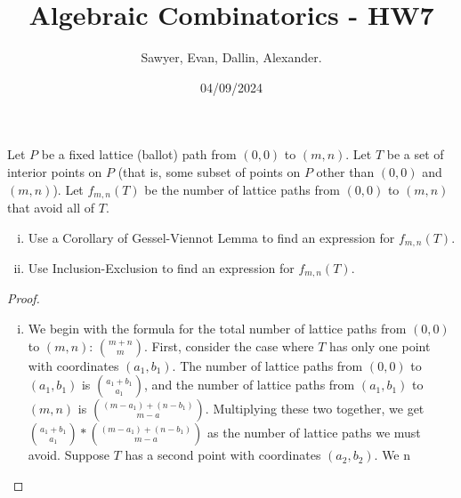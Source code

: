 \documentclass[letterpaper]{article}
\title{Algebraic Combinatorics - HW7}
\author{Sawyer, Evan, Dallin, Alexander.}
\date{04/09/2024}
\begin{document}
\maketitle
\begin{quest}[\textcolor{red}{Lattice Paths avoiding a certain set of points}]
Let $P$ be a fixed lattice (ballot) path from $(0,0)$ to $(m,n)$. Let $T$ be a set of interior points on $P$ (that is, some subset of points on $P$ other than $(0,0)$ and $(m,n)$). Let $f_{m,n}(T)$ be the number of lattice paths from $(0,0)$ to $(m,n)$ that avoid all of $T$.
\begin{enumerate}[(i)]
    \item Use a Corollary of Gessel-Viennot Lemma to find an expression for $f_{m,n}(T)$.
    \item Use Inclusion-Exclusion to find an expression for $f_{m,n}(T)$.
\end{enumerate}
\end{quest}
\begin{proof}
\begin{enumerate}[(i)]
    \item We begin with the formula for the total number of lattice paths from $(0,0)$ to $(m,n)$: ${ m+n \choose m}$. First, consider the case where $T$ has only one point with coordinates $(a_1, b_1)$. The number of lattice paths from $(0,0)$ to $(a_1, b_1)$ is ${a_1+b_1 \choose a_1}$, and the number of lattice paths from $(a_1, b_1)$ to $(m,n)$ is ${(m-a_1)+(n-b_1) \choose m-a}$. Multiplying these two together, we get ${a_1+b_1 \choose a_1}*{(m-a_1)+(n-b_1) \choose m-a}$ as the number of lattice paths we must avoid. Suppose $T$ has a second point with coordinates $(a_2, b_2)$. We n
\end{enumerate}
\end{proof}
\end{document}
